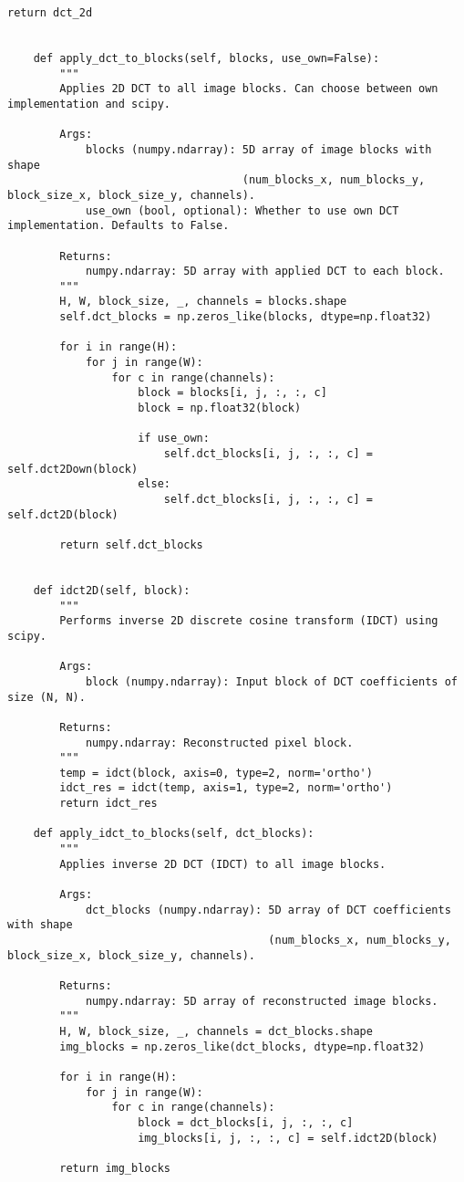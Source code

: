 \begin{lstlisting}[caption={Класс двумерного дикретного косинусного преобразования}]
        return dct_2d
    

    def apply_dct_to_blocks(self, blocks, use_own=False):
        """
        Applies 2D DCT to all image blocks. Can choose between own implementation and scipy.

        Args:
            blocks (numpy.ndarray): 5D array of image blocks with shape
                                    (num_blocks_x, num_blocks_y, block_size_x, block_size_y, channels).
            use_own (bool, optional): Whether to use own DCT implementation. Defaults to False.

        Returns:
            numpy.ndarray: 5D array with applied DCT to each block.
        """
        H, W, block_size, _, channels = blocks.shape
        self.dct_blocks = np.zeros_like(blocks, dtype=np.float32)

        for i in range(H):
            for j in range(W):
                for c in range(channels):
                    block = blocks[i, j, :, :, c]
                    block = np.float32(block)

                    if use_own:
                        self.dct_blocks[i, j, :, :, c] = self.dct2Down(block)
                    else:
                        self.dct_blocks[i, j, :, :, c] = self.dct2D(block)

        return self.dct_blocks
    

    def idct2D(self, block):
        """
        Performs inverse 2D discrete cosine transform (IDCT) using scipy.

        Args:
            block (numpy.ndarray): Input block of DCT coefficients of size (N, N).

        Returns:
            numpy.ndarray: Reconstructed pixel block.
        """
        temp = idct(block, axis=0, type=2, norm='ortho')
        idct_res = idct(temp, axis=1, type=2, norm='ortho')
        return idct_res
    
    def apply_idct_to_blocks(self, dct_blocks):
        """
        Applies inverse 2D DCT (IDCT) to all image blocks.

        Args:
            dct_blocks (numpy.ndarray): 5D array of DCT coefficients with shape
                                        (num_blocks_x, num_blocks_y, block_size_x, block_size_y, channels).

        Returns:
            numpy.ndarray: 5D array of reconstructed image blocks.
        """
        H, W, block_size, _, channels = dct_blocks.shape
        img_blocks = np.zeros_like(dct_blocks, dtype=np.float32)

        for i in range(H):
            for j in range(W):
                for c in range(channels):
                    block = dct_blocks[i, j, :, :, c]
                    img_blocks[i, j, :, :, c] = self.idct2D(block)

        return img_blocks
\end{lstlisting}



